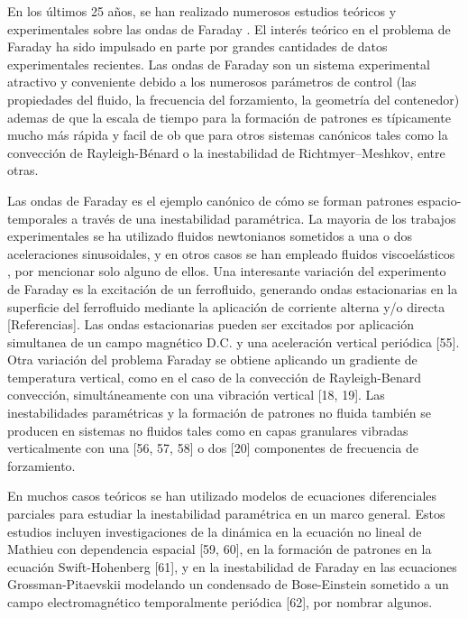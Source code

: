 En los últimos 25 años, se han realizado numerosos estudios teóricos y experimentales sobre las ondas de Faraday \cite{miles1990parametrically, Muller1998a}. El interés teórico en el problema de Faraday ha sido impulsado en parte por grandes cantidades de datos experimentales recientes. Las ondas de Faraday son un sistema experimental atractivo y conveniente debido a los numerosos parámetros de control (las propiedades del fluido, la frecuencia del forzamiento, la geometría del contenedor) ademas de que la escala de tiempo para la formación de patrones es típicamente mucho más rápida y facil de ob que para otros sistemas canónicos tales como la convección de Rayleigh-Bénard o la inestabilidad de Richtmyer–Meshkov, entre otras.

Las ondas de Faraday es el ejemplo canónico de cómo se forman patrones espacio-temporales a través de una inestabilidad paramétrica. La mayoria de los trabajos experimentales se ha utilizado fluidos newtonianos sometidos a una o dos aceleraciones sinusoidales, y en otros casos se han empleado fluidos viscoelásticos \cite{Wagner1999}, por mencionar solo alguno de ellos. Una interesante variación del experimento de Faraday es la excitación de un ferrofluido, generando ondas estacionarias en la superficie del ferrofluido mediante la aplicación de corriente alterna y/o directa [Referencias]. Las ondas estacionarias pueden ser excitados por aplicación simultanea de un campo magnético D.C. y una aceleración vertical periódica [55]. Otra variación del problema Faraday se obtiene aplicando un gradiente de temperatura vertical, como en el caso de la convección de Rayleigh-Benard convección, simultáneamente con una vibración vertical [18, 19]. Las inestabilidades paramétricas y la formación de patrones no fluida también se producen en sistemas no fluidos tales como en capas granulares vibradas verticalmente con una [56, 57, 58] o dos [20] componentes de frecuencia de forzamiento.

En muchos casos teóricos se han utilizado modelos de ecuaciones diferenciales parciales para estudiar la inestabilidad paramétrica en un marco general. Estos estudios incluyen investigaciones de la dinámica en la ecuación no lineal de Mathieu con dependencia espacial [59, 60], en la formación de patrones en la ecuación Swift-Hohenberg [61], y en la inestabilidad de Faraday en las ecuaciones Grossman-Pitaevskii modelando un condensado de Bose-Einstein sometido a un campo electromagnético temporalmente periódica [62], por nombrar algunos. %
	
